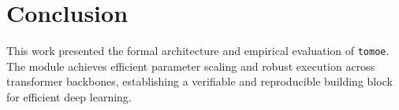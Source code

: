 \section{Conclusion}
This work presented the formal architecture and empirical evaluation of \texttt{tomoe}. The module achieves efficient parameter scaling and robust execution across transformer backbones, establishing a verifiable and reproducible building block for efficient deep learning.
